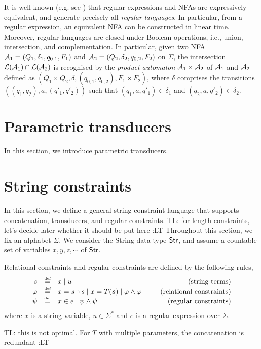 \documentclass{llncs}
\newcommand{\tl}[1]{\color{blue} {TL: #1 :LT} \color{black}}
\newcommand{\tl}[1]{}
\newcommand{\concat} {\circ}
\newcommand{\str} {{\sf Str}}
\begin{document}
It is well-known (e.g. see \cite{HU79}) that regular expressions and NFAs are
expressively equivalent, and generate precisely all \emph{regular languages}.
In particular, from a regular expression, an equivalent NFA can be constructed
in linear time. Moreover, regular languages are closed under Boolean
operations, i.e., union, intersection, and complementation.
In particular, given two NFA $\mathcal{A}_1=(Q_1, \delta_1, q_{0,1}, F_1)$ and
$\mathcal{A}_2=(Q_2, \delta_2, q_{0,2}, F_2)$ on $\Sigma$, the intersection $\mathcal{L}(\mathcal{A}_1)
\cap \mathcal{L}(\mathcal{A}_2)$ is recognised by the \emph{product automaton} $\mathcal{A}_1 \times
\mathcal{A}_2$ of $\mathcal{A}_1$ and $\mathcal{A}_2$ defined as $(Q_1 \times Q_2, \delta, (q_{0,1}, q_{0,2}), F_1 \times F_2)$, where $\delta$ comprises the transitions $((q_1, q_2), a, (q'_1, q'_2))$ such that $(q_1, a, q'_1) \in \delta_1$ and $(q_2, a, q'_2) \in \delta_2$.

\section{Parametric transducers}

In this section, we introduce parametric transducers.

\section{String constraints} \label{sec-core}

In this section, we define a general string constraint language that supports
concatenation, transducers, and regular constraints.
\tl{for length constraints, let's decide later whether it should be put here}
Throughout this section, we fix an alphabet $\Sigma$.
We consider the String data type $\str$, and assume a countable set of variables
$x, y, z, \cdots$ of $\str$.


\begin{definition}
	Relational constraints and regular constraints are defined by the following rules,
	\[
	\begin{array}{r c l cr}
	s &\eqdef & x \mid u & \ \ & \mbox{(string terms)}\\
	\varphi &\eqdef & x = s \concat s  \mid  x = T(\vec{s}) \mid \varphi \wedge \varphi & \ \ & \mbox{(relational constraints)}\\
	\psi & \eqdef & x \in e \mid \psi \wedge \psi %
	& \ \ & \mbox{(regular constraints)} \\
	\end{array}
	\]
	where $x$ is a string variable, $u \in \Sigma^\ast$ and $e$ is a regular expression over $\Sigma$.
\end{definition}
\tl{this is not optimal. For $T$ with multiple parameters, the concatenation is redundant}
\end{document}
